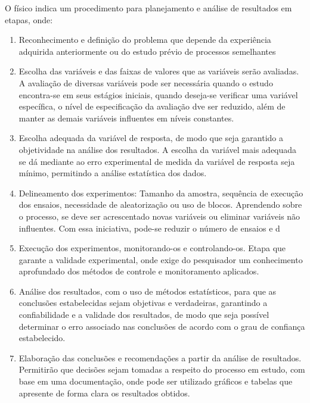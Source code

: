 O físico \cite{analise_resultados2} indica um procedimento para planejamento e análise de resultados em etapas, onde:
 \begin{enumerate}
   \item Reconhecimento e definição do problema que depende da experiência adquirida anteriormente ou do estudo prévio de processos semelhantes
   
   \item Escolha das variáveis e das faixas de valores que as variáveis serão avaliadas. A avaliação de diversas variáveis pode ser necessária quando o estudo encontra-se em seus estágios iniciais, quando deseja-se verificar uma variável específica, o nível de especificação da avaliação dve ser reduzido, além de manter as demais variáveis influentes em níveis constantes.
   
   \item Escolha adequada da variável de resposta, de modo que seja garantido a objetividade na análise dos resultados. A escolha da variável mais adequada se dá mediante ao erro experimental de medida da variável de resposta seja mínimo, permitindo a análise estatística dos dados. 
   
   \item Delineamento dos experimentos: Tamanho da amostra, sequência de execução dos ensaios, necessidade de aleatorização ou uso de blocos. Aprendendo sobre o processo, se deve ser acrescentado novas variáveis ou eliminar variáveis não influentes. Com essa iniciativa, pode-se reduzir o número de ensaios e d
   
   \item Execução dos experimentos, monitorando-os e controlando-os. Etapa que garante a validade experimental, onde exige do pesquisador um conhecimento aprofundado dos métodos de controle e monitoramento aplicados. 
   
   \item Análise dos resultados, com o uso de métodos estatísticos, para que as conclusões estabelecidas sejam objetivas e verdadeiras, garantindo a confiabilidade e a validade dos resultados, de modo que seja possível determinar o erro associado nas conclusões de acordo com o grau de confiança estabelecido.
   
   \item Elaboração das conclusões e recomendações a partir da análise de resultados. Permitirão que decisões sejam tomadas a respeito do processo em estudo, com base em uma documentação, onde pode ser utilizado gráficos e tabelas que apresente de forma clara os resultados obtidos.
   
 \end{enumerate}

